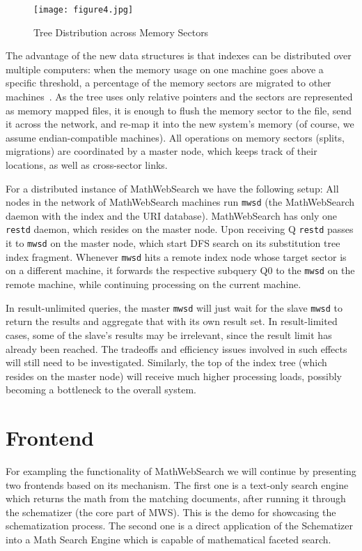 \documentclass{deliverablereport}
\def\MWS{\textsf{MathWebSearch}\xspace}
\begin{document}
\begin{figure}[h]
\centering
 \texttt{[image: figure4.jpg]}
 \caption{Tree Distribution across Memory Sectors}
 \label{fig:memory_sectors}
\end{figure}

The advantage of the new data structures is that indexes can be distributed over multiple
computers: when the memory usage on one machine goes above a specific threshold, a
percentage of the memory sectors are migrated to other
machines~\cite{ProKoh:mwsofse11}. As the tree uses only relative pointers and the sectors
are represented as memory mapped files, it is enough to flush the memory sector to the
file, send it across the network, and re-map it into the new system’s memory (of course,
we assume endian-compatible machines). All operations on memory sectors (splits,
migrations) are coordinated by a master node, which keeps track of their locations, as
well as cross-sector links.

For a distributed instance of \MWS we have the following setup: All nodes in the network
of \MWS machines run \texttt{mwsd} (the \MWS daemon with the index and the URI
database). \MWS has only one \texttt{restd} daemon, which resides on the master node. Upon
receiving Q \texttt{restd} passes it to \texttt{mwsd} on the master node, which start DFS
search on its substitution tree index fragment. Whenever \texttt{mwsd} hits a remote index
node whose target sector is on a different machine, it forwards the respective subquery Q0
to the \texttt{mwsd} on the remote machine, while continuing processing on the current
machine.

In result-unlimited queries, the master \texttt{mwsd} will just wait for the slave
\texttt{mwsd} to return the results and aggregate that with its own result set. In
result-limited cases, some of the slave’s results may be irrelevant, since the result
limit has already been reached. The tradeoffs and efficiency issues involved in such
effects will still need to be investigated. Similarly, the top of the index tree (which
resides on the master node) will receive much higher processing loads, possibly becoming a
bottleneck to the overall system.


\section{Frontend}\label{frontend}
For exampling the functionality of \MWS we will continue by presenting two frontends based
on its mechanism. The first one is a text-only search engine which returns the math from
the matching documents, after running it through the schematizer (the core part of
MWS). This is the demo for showcasing the schematization process. The second one is a
direct application of the Schematizer into a Math Search Engine which is capable of
mathematical faceted search.~\cite{HamKoh:fsfm15}
\end{document}

